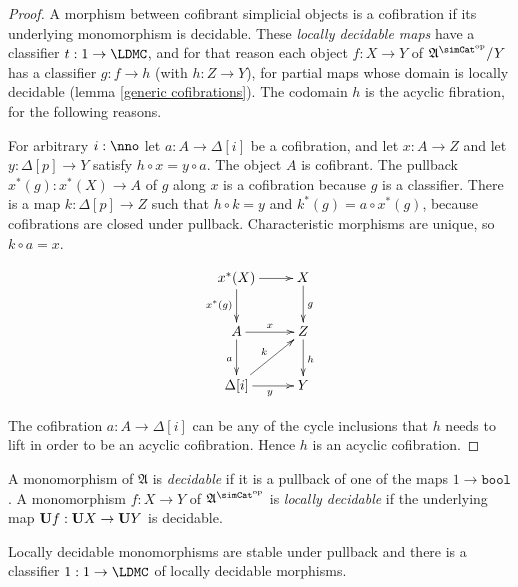 \documentclass{tac}
\newcommand\hide[1]{}
\newcommand\ri{^*}
\newcommand\dual{^{\mathrm{op}}}
\newcommand\s{^{\simCat\dual}}
\newcommand\of{:}
\newcommand\simplex\Delta
\newcommand\bool{\mathtt{bool}}
\newcommand\ambient{\mathfrak A}
\begin{document}
\begin{proof} A morphism between cofibrant simplicial objects is a cofibration if its underlying monomorphism is decidable. These \emph{locally decidable maps} have a classifier $t\of 1\to \LDMC$, and for that reason each object $f\of X\to Y$ of $\ambient\s/Y$ has a classifier $g\of f\to h$ (with $h\of Z\to Y$), for partial maps whose domain is locally decidable (lemma \ref{generic cofibrations}).
The codomain $h$ is the acyclic fibration, for the following reasons.

For arbitrary $i\of\nno$ let $a\of A\to \simplex[i]$ be a cofibration, and let $x\of A\to Z$ and let $y\of \simplex[p]\to Y$ satisfy $h\circ x = y\circ a$. The object $A$ is cofibrant. The pullback $x\ri(g)\of x\ri(X)\to A$ of $g$ along $x$ is a cofibration because $g$ is a classifier. There is a map $k\of\simplex[p]\to Z$ such that $h\circ k = y$ and $k\ri(g) = a\circ x\ri(g)$, because cofibrations are closed under pullback. Characteristic morphisms are unique, so $k\circ a = x$.

\[\xymatrix{
x\ri(X) \ar[r]\ar[d]_{x\ri(g)} & X\ar[d]^g\\
A\ar[r]^x \ar[d]_a & Z\ar[d]^h\\
\simplex[i]\ar[r]_{y}\ar@{>}[ur]^k & Y
}\]

The cofibration $a\of A\to \simplex[i]$ can be any of the cycle inclusions that $h$ needs to lift in order to be an acyclic cofibration. Hence $h$ is an acyclic cofibration.

\hide{While $g$ is locally decidable, how do we know that it is a cofibration?}
\end{proof}

\begin{definition} A monomorphism of $\ambient$ is \emph{decidable} if it is a pullback of one of the maps $1\to \bool$.
A monomorphism $f\of X\to Y$ of $\ambient\s$ is \emph{locally decidable} if the underlying map $\base f\of \base X\to\base Y$ is decidable.
\end{definition}

\begin{lemma} Locally decidable monomorphisms are stable under pullback and there is a classifier $1\of 1\to \LDMC$ of locally decidable morphisms. \label{locally decidable} \end{lemma}
\end{document}
